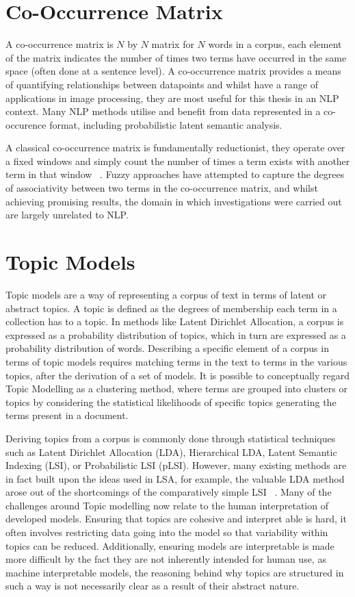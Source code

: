 \documentclass[10pt]{report}
\begin{document}
\section{Co-Occurrence Matrix}
A co-occurrence matrix is $N$ by $N$ matrix for $N$ words in a corpus, each element of the matrix indicates the number of times two terms have occurred in the same space (often done at a sentence level). A co-occurrence matrix provides a means of quantifying relationships between datapoints and whilst have a range of applications in image processing, they are most useful for this thesis in an NLP context. Many NLP methods utilise and benefit from data represented in a co-occurence format, including probabilistic latent semantic analysis.~\cite{Hofmann1999-qb}

A classical co-occurrence matrix is fundamentally reductionist, they operate over a fixed windows and simply count the number of times a term exists with another term in that window ~\cite{Lin2008-ss, Biemann2006-ke}. Fuzzy approaches have attempted to capture the degrees of associativity between two terms in the co-occurrence matrix, and whilst achieving promising results, the domain in which investigations were carried out are largely unrelated to NLP. ~\cite{Maji2008-xe, Munklang2013-aq }

\section{Topic Models}
Topic models are a way of representing a corpus of text in terms of latent or abstract topics. A topic is defined as the degrees of membership each term in a collection has to a topic. In methods like Latent Dirichlet Allocation, a corpus is expressed as a probability distribution of topics, which in turn are expressed as a probability distribution of words. Describing a specific element of a corpus in terms of topic models requires matching terms in the text to terms in the various topics, after the derivation of a set of models. It is possible to conceptually regard Topic Modelling as a clustering method, where terms are grouped into clusters or topics by considering the statistical likelihoods of specific topics generating the terms present in a document.

Deriving topics from a corpus is commonly done through statistical techniques such as Latent Dirichlet Allocation (LDA), Hierarchical LDA, Latent Semantic Indexing (LSI), or Probabilistic LSI (pLSI). However, many existing methods are in fact built upon the ideas used in LSA, for example, the valuable LDA method arose out of the shortcomings of the comparatively simple LSI ~\cite{Blei2003-dj}. Many of the challenges around Topic modelling now relate to the human interpretation of developed models. Ensuring that topics are cohesive and interpret able is hard, it often involves restricting data going into the model so that variability within topics can be reduced. Additionally, ensuring models are interpretable is made more difficult by the fact they are not inherently intended for human use, as machine interpretable models, the reasoning behind why topics are structured in such a way is not necessarily clear as a result of their abstract nature. 
\end{document}
